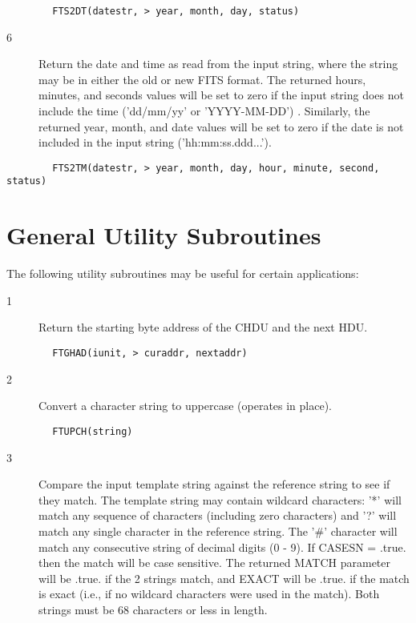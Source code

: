 \documentclass[11pt]{book}
\begin{document}
\begin{verbatim}
        FTS2DT(datestr, > year, month, day, status)
\end{verbatim}


\begin{description}
\item[6 ] Return the date and time as read from the input string, where the
string may be in either the old  or new FITS format.  The returned hours,
minutes, and seconds values will be set to zero if the input string
does not include the time ('dd/mm/yy' or 'YYYY-MM-DD') .  Similarly,
the returned year, month, and date values will be set to zero if the
date is not included in the input string ('hh:mm:ss.ddd...').
\end{description}

\begin{verbatim}
        FTS2TM(datestr, > year, month, day, hour, minute, second, status)
\end{verbatim}


\section{General Utility Subroutines \label{FTGHAD}}

The following utility subroutines may be useful for certain applications:


\begin{description}
\item[1 ] Return the starting byte address of the CHDU and the next HDU.
\end{description}

\begin{verbatim}
        FTGHAD(iunit, > curaddr, nextaddr)
\end{verbatim}

\begin{description}
\item[2 ] Convert a character string to uppercase (operates in place).
\end{description}

\begin{verbatim}
        FTUPCH(string)
\end{verbatim}

\begin{description}
\item[3 ] Compare the input template string against the reference string
    to see if they match.  The template string may contain wildcard
    characters: '*' will match any sequence of characters (including
    zero characters) and '?' will match any single character in the
    reference string. The '\#' character will match any consecutive string
    of decimal digits (0 - 9).  If CASESN = .true. then the match will be
    case sensitive.  The returned MATCH parameter will be .true. if
    the 2 strings match, and EXACT will be .true. if the match is
    exact (i.e., if no wildcard characters were used in the match).
   Both strings must be 68 characters or less in length.
\end{description}
\end{document}
